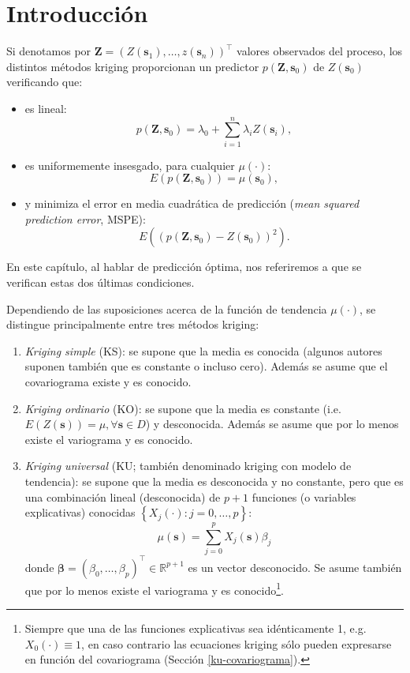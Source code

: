 \documentclass[
]{book}
\theoremstyle{break}
\theoremstyle{definition}
\theoremstyle{definition}
\theoremstyle{definition}
\theoremstyle{definition}
\theoremstyle{remark}
\begin{document}
\section{Introducción}\label{introduccion}

Si denotamos por \(\mathbf{Z}=\left( Z(\mathbf{s}_{1}), \ldots, z(\mathbf{s}_{n} )\right)^\top\) valores observados del proceso, los distintos métodos kriging proporcionan un predictor \(p(\mathbf{Z},\mathbf{s}_{0})\) de \(Z(\mathbf{s}_{0})\) verificando que:

\begin{itemize}
\item
  es lineal:
  \[p(\mathbf{Z},\mathbf{s}_{0}) = \lambda_{0} + \sum\limits_{i=1}^{n}\lambda_{i} Z(\mathbf{s}_{i}),\]
\item
  es uniformemente insesgado, para cualquier \(\mu(\cdot)\):
  \[E(p(\mathbf{Z},\mathbf{s}_{0}))=\mu(\mathbf{s}_{0}),\]
\item
  y minimiza el error en media cuadrática de predicción (\emph{mean squared prediction error}, MSPE):
  \[E\left( \left( p(\mathbf{Z},\mathbf{s}_{0})-Z(\mathbf{s}_{0})\right)^2 \right).\]
\end{itemize}

En este capítulo, al hablar de predicción óptima, nos referiremos a que se verifican estas dos últimas condiciones.

Dependiendo de las suposiciones acerca de la función de tendencia \(\mu(\cdot)\), se distingue principalmente entre tres métodos kriging:

\begin{enumerate}
\def\labelenumi{\arabic{enumi}.}
\item
  \emph{Kriging simple} (KS): se supone que la media es conocida (algunos autores suponen también que es constante o incluso cero).
  Además se asume que el covariograma existe y es conocido.
\item
  \emph{Kriging ordinario} (KO): se supone que la media es constante (i.e.~\(E(Z(\mathbf{s}))=\mu ,\forall \mathbf{s}\in D\)) y desconocida.
  Además se asume que por lo menos existe el variograma y es conocido.
\item
  \emph{Kriging universal} (KU; también denominado kriging con modelo de tendencia): se supone que la media es desconocida y no constante, pero
  que es una combinación lineal (desconocida) de \(p+1\) funciones (o variables explicativas) conocidas \(\left\{ X_{j} (\cdot):j=0, \ldots,p\right\}\):
  \[\mu(\mathbf{s})=\sum\limits_{j=0}^{p}X_{j} (\mathbf{s})\beta_{j}\]
  donde \(\boldsymbol{\beta}=(\beta_{0}, \ldots, \beta_{p} )^\top \in \mathbb{R}^{p+1}\) es un vector desconocido.
  Se asume también que por lo menos existe el variograma y es conocido\footnote{Siempre que una de las funciones explicativas sea idénticamente 1, e.g.~\(X_{0} (\cdot)\equiv 1\), en caso contrario las ecuaciones kriging sólo pueden expresarse en función del covariograma (Sección \ref{ku-covariograma}).}.
\end{enumerate}
\end{document}
